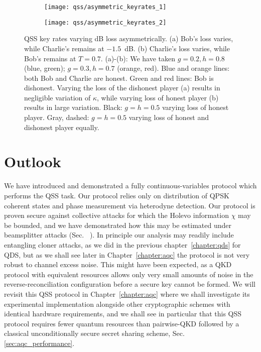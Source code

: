\begin{figure}[htp]
\centering
	\begin{subfigure}{0.49\linewidth}
	\centering
	\texttt{[image: qss/asymmetric\_keyrates\_1]}
	\caption{}
	\end{subfigure}
	\begin{subfigure}{0.49\linewidth}
	\centering
	\texttt{[image: qss/asymmetric\_keyrates\_2]}
	\caption{}
	\end{subfigure}
\caption{\label{fig:qss_keyrate_asymmetric} QSS key rates varying dB loss asymmetrically. (a) Bob's loss varies, while Charlie's remains at $-1.5$~dB. (b) Charlie's loss varies, while Bob's remains at $T=0.7$. (a)-(b): We have taken $g = 0.2, h=0.8$ (blue, green); $g=0.3, h=0.7$ (orange, red). Blue and orange lines: both Bob and Charlie are honest. Green and red lines: Bob is dishonest. Varying the loss of the dishonest player (a) results in negligible variation of $\kappa$, while varying loss of honest player (b) results in large variation. Black: $g=h=0.5$ varying loss of honest player. Gray, dashed: $g=h=0.5$ varying loss of honest and dishonest player equally.}
\end{figure}












\clearpage
\section{Outlook}
We have introduced and demonstrated a fully continuous-variables protocol which performs the QSS task. Our protocol relies only on distribution of QPSK coherent states and phase measurement via heterodyne detection. Our protocol is proven secure against collective attacks for which the Holevo information $\chi$ may be bounded, and we have demonstrated how this may be estimated under beamsplitter attacks (Sec.~%
). In principle our analysis may readily include entangling cloner attacks, as we did in the previous chapter~\ref{chapter:qds} for QDS, but as we shall see later in Chapter~\ref{chapter:aqc} the protocol is not very robust to channel excess noise. This might have been expected, as a QKD protocol with equivalent resources \cite{Papanastasiou2018} allows only very small amounts of noise in the reverse-reconciliation configuration before a secure key cannot be formed. We will revisit this QSS protocol in Chapter~\ref{chapter:aqc} where we shall investigate its experimental implementation alongside other cryptographic schemes with identical hardware requirements, and we shall see in particular that this QSS protocol requires fewer quantum resources than pairwise-QKD followed by a classical unconditionally secure secret sharing scheme, Sec.
\ref{sec:aqc_performance}.

